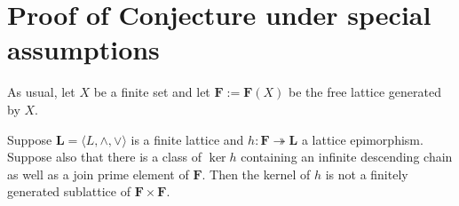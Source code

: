 \section{Proof of Conjecture under special assumptions}\label{app:conjecture}
As usual, let $X$ be a finite set and let $\mathbf F := \mathbf F (X)$ be the free 
lattice generated by $X$.
\begin{proposition}\label{prop:conjecture}
Suppose $\mathbf L = \langle L, \wedge, \vee\rangle$ is a finite lattice and 
$h\colon \mathbf{F} \twoheadrightarrow \mathbf{L}$ a lattice epimorphism.
Suppose also that there is a class of $\ker h$ containing an infinite descending 
chain as well as a join prime element of $\mathbf F$. 
Then the kernel of $h$ is not a finitely generated sublattice 
of $\mathbf F \times \mathbf F$.
\end{proposition}
